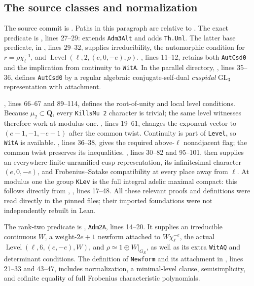\documentclass[11pt,a4paper]{article}
\theoremstyle{definition}
\begin{document}
\subsection{The source classes and normalization}
The source commit is
.
Paths in this paragraph are relative to
.
The exact predicate is
,
lines 27--29:  extends \texttt{Adm3Alt} and adds
\texttt{Th.Unl}. The latter base predicate, in ,
lines 29--32, supplies irreducibility, the automorphic condition for
$r=\rho\chi_\ell^{-1}$, and
$\operatorname{Level}(\ell,2,(e,0,-e),\rho)$.
,
lines 11--12, retains both \texttt{AutCsd0} and the implication
from continuity to \texttt{WitA}.
In the parallel 
directory, , lines 35--36,
defines \texttt{AutCsd0} by a regular algebraic conjugate-self-dual
\emph{cuspidal} $\mathrm{GL}_3$ representation with attachment.

,
lines 66--67 and 89--114, defines the root-of-unity and local
level conditions. Because $\mu_2\subset\mathbf Q$, every
\texttt{KillsMu 2} character is trivial; the same level witnesses
therefore work at modulus one.
,
lines 19--61, changes the exponent vector to
$(e-1,-1,-e-1)$ after the common twist.
Continuity is part of \texttt{Level}, so \texttt{WitA} is available.
,
lines 36--38, gives the required above-$\ell$ nonadjacent flag;
the common twist preserves its inequalities.
, lines 30--82 and 95--101, then supplies
an everywhere-finite-unramified cusp representation, its infinitesimal
character $(e,0,-e)$, and Frobenius--Satake compatibility at every
place away from $\ell$.
At modulus one the group \texttt{KLev} is the full integral adelic
maximal compact: this follows directly from
, ,
lines 17--48. All these relevant proofs and definitions were read
directly in the pinned files; their imported foundations were not
independently rebuilt in Lean.

The rank-two predicate is
,
\texttt{Adm2A}, lines 14--20.
It supplies an irreducible continuous $W$, a weight-$2e+1$
newform attached to $W\chi_\ell^{-e}$, the actual
$\operatorname{Level}(\ell,6,(e,-e),W)$, and
$\rho\simeq1\oplus W|_{G_E}$, as well as its extra
\texttt{WitAQ} and determinant conditions.
The definition of \texttt{Newform} and its attachment in
, lines 21--33 and 43--47,
includes normalization, a minimal-level clause, semisimplicity,
and cofinite equality of full Frobenius characteristic polynomials.
\end{document}
